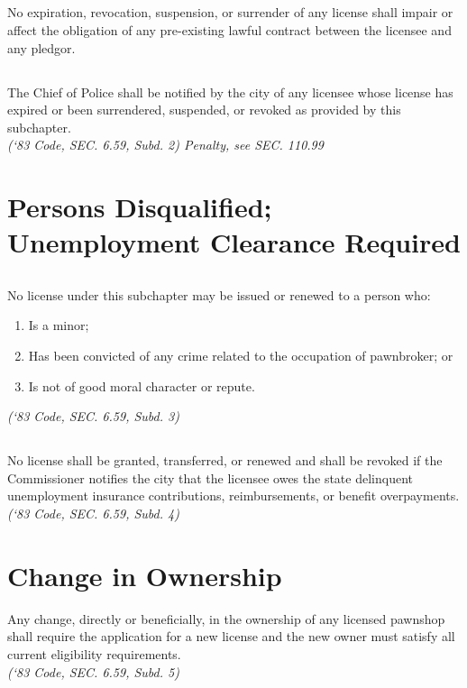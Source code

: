\subsection{}
No expiration, revocation, suspension, or surrender of any license shall impair or affect the obligation of any pre-existing lawful contract between the licensee and any pledgor.
\subsection{}
The Chief of Police shall be notified by the city of any licensee whose license has expired or been surrendered, suspended, or revoked as provided by this subchapter.\\
\emph{(‘83 Code, SEC. 6.59, Subd. 2)  Penalty, see SEC. 110.99}
\section{Persons Disqualified; Unemployment Clearance Required}
\subsection{}
No license under this subchapter may be issued or renewed to a person who:
\begin{enumerate}[{\indent}1)]
    \item Is a minor; 
    \item Has been convicted of any crime related to the occupation of pawnbroker; or 
    \item Is not of good moral character or repute.
\end{enumerate}
\emph{(‘83 Code, SEC. 6.59, Subd. 3)}
\subsection{}
No license shall be granted, transferred, or renewed and shall be revoked if the Commissioner notifies the city that the licensee owes the state delinquent unemployment insurance contributions, reimbursements, or benefit overpayments.\\
\emph{(‘83 Code, SEC. 6.59, Subd. 4)}
\section{Change in Ownership}
Any change, directly or beneficially, in the ownership of any licensed pawnshop shall require the application for a new license and the new owner must satisfy all current eligibility requirements.\\
\emph{(‘83 Code, SEC. 6.59, Subd. 5)}
